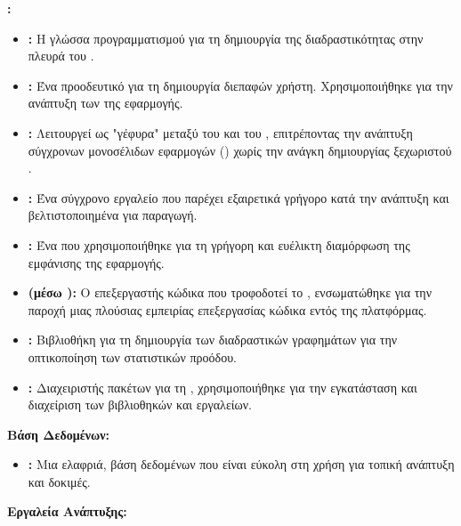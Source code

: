 \textbf{:}
\begin{itemize}[leftmargin=*, noitemsep]
    \item \textbf{:} Η γλώσσα προγραμματισμού για τη δημιουργία της διαδραστικότητας στην πλευρά του .
    \item \textbf{:} Ένα προοδευτικό  για τη δημιουργία διεπαφών χρήστη. Χρησιμοποιήθηκε για την ανάπτυξη των  της εφαρμογής.
    \item \textbf{:} Λειτουργεί ως "γέφυρα" μεταξύ του  και του , επιτρέποντας την ανάπτυξη σύγχρονων μονοσέλιδων εφαρμογών () χωρίς την ανάγκη δημιουργίας ξεχωριστού .
    \item \textbf{:} Ένα σύγχρονο εργαλείο  που παρέχει εξαιρετικά γρήγορο  κατά την ανάπτυξη και βελτιστοποιημένα  για παραγωγή.
    \item \textbf{:} Ένα  που χρησιμοποιήθηκε για τη γρήγορη και ευέλικτη διαμόρφωση της εμφάνισης της εφαρμογής.
    \item \textbf{ (μέσω ):} Ο επεξεργαστής κώδικα που τροφοδοτεί το , ενσωματώθηκε για την παροχή μιας πλούσιας εμπειρίας επεξεργασίας κώδικα  εντός της πλατφόρμας.
    \item \textbf{:} Βιβλιοθήκη  για τη δημιουργία των διαδραστικών γραφημάτων για την οπτικοποίηση των στατιστικών προόδου.
    \item \textbf{:} Διαχειριστής πακέτων για τη , χρησιμοποιήθηκε για την εγκατάσταση και διαχείριση των  βιβλιοθηκών και εργαλείων.
\end{itemize}

\textbf{Βάση Δεδομένων:}
\begin{itemize}[leftmargin=*, noitemsep]
    \item \textbf{:} Μια ελαφριά,  βάση δεδομένων που είναι εύκολη στη χρήση για τοπική ανάπτυξη και δοκιμές.
\end{itemize}

\textbf{Εργαλεία Ανάπτυξης:} 


